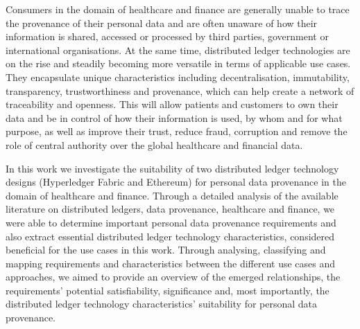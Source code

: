 
\Abstract

Consumers in the domain of healthcare and finance are generally unable to trace the provenance of their personal data and are often unaware of how their information is shared, accessed or processed by third parties, government or international organisations. At the same time, distributed ledger technologies are on the rise and steadily becoming more versatile in terms of applicable use cases. They encapsulate unique characteristics including decentralisation, immutability, transparency, trustworthiness and provenance, which can help create a network of traceability and openness. This will allow patients and customers to own their data and be in control of how their information is used, by whom and for what purpose, as well as improve their trust, reduce fraud, corruption and remove the role of central authority over the global healthcare and financial data.

In this work we investigate the suitability of two distributed ledger technology designs (Hyperledger Fabric and Ethereum) for personal data provenance in the domain of healthcare and finance. Through a detailed analysis of the available literature on distributed ledgers, data provenance, healthcare and finance, we were able to determine important personal data provenance requirements and also extract essential distributed ledger technology characteristics, considered beneficial for the use cases in this work. Through analysing, classifying and mapping requirements and characteristics between the different use cases and approaches, we aimed to provide an overview of the emerged relationships, the requirements' potential satisfiability, significance and, most importantly, the distributed ledger technology characteristics' suitability for personal data provenance.